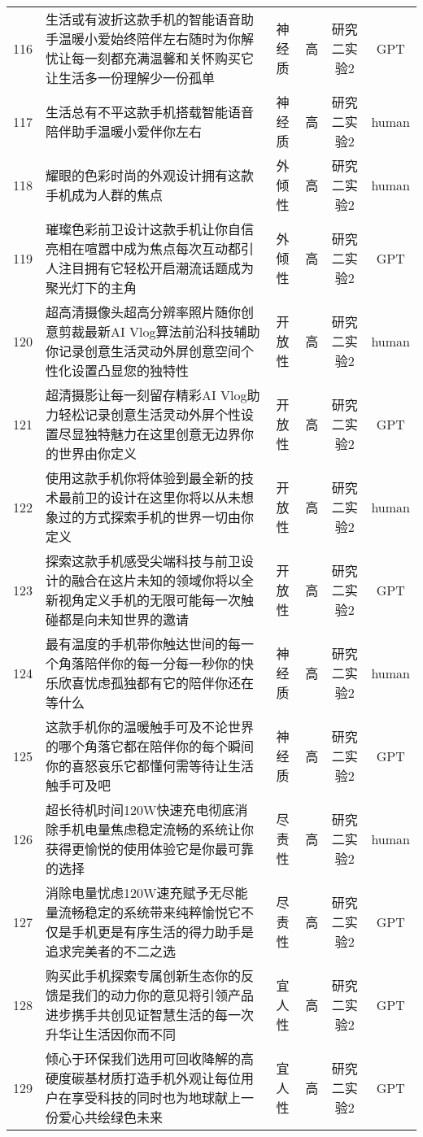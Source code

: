 {\begin{longtable}{c p{8cm} c c c c}
        116 & 生活或有波折这款手机的智能语音助手温暖小爱始终陪伴左右随时为你解忧让每一刻都充满温馨和关怀购买它让生活多一份理解少一份孤单 & 神经质 & 高 & 研究二实验2 & GPT \\
        117 & 生活总有不平这款手机搭载智能语音陪伴助手温暖小爱伴你左右 & 神经质 & 高 & 研究二实验2 & human \\
        118 & 耀眼的色彩时尚的外观设计拥有这款手机成为人群的焦点 & 外倾性 & 高 & 研究二实验2 & human \\
        119 & 璀璨色彩前卫设计这款手机让你自信亮相在喧嚣中成为焦点每次互动都引人注目拥有它轻松开启潮流话题成为聚光灯下的主角 & 外倾性 & 高 & 研究二实验2 & GPT \\
        120 & 超高清摄像头超高分辨率照片随你创意剪裁最新AI Vlog算法前沿科技辅助你记录创意生活灵动外屏创意空间个性化设置凸显您的独特性 & 开放性 & 高 & 研究二实验2 & human \\
        121 & 超清摄影让每一刻留存精彩AI Vlog助力轻松记录创意生活灵动外屏个性设置尽显独特魅力在这里创意无边界你的世界由你定义 & 开放性 & 高 & 研究二实验2 & GPT \\
        122 & 使用这款手机你将体验到最全新的技术最前卫的设计在这里你将以从未想象过的方式探索手机的世界一切由你定义 & 开放性 & 高 & 研究二实验2 & human \\
        123 & 探索这款手机感受尖端科技与前卫设计的融合在这片未知的领域你将以全新视角定义手机的无限可能每一次触碰都是向未知世界的邀请 & 开放性 & 高 & 研究二实验2 & GPT \\
        124 & 最有温度的手机带你触达世间的每一个角落陪伴你的每一分每一秒你的快乐欣喜忧虑孤独都有它的陪伴你还在等什么 & 神经质 & 高 & 研究二实验2 & human \\
        125 & 这款手机你的温暖触手可及不论世界的哪个角落它都在陪伴你的每个瞬间你的喜怒哀乐它都懂何需等待让生活触手可及吧 & 神经质 & 高 & 研究二实验2 & GPT \\
        126 & 超长待机时间120W快速充电彻底消除手机电量焦虑稳定流畅的系统让你获得更愉悦的使用体验它是你最可靠的选择 & 尽责性 & 高 & 研究二实验2 & human \\
        127 & 消除电量忧虑120W速充赋予无尽能量流畅稳定的系统带来纯粹愉悦它不仅是手机更是有序生活的得力助手是追求完美者的不二之选 & 尽责性 & 高 & 研究二实验2 & GPT \\
        128 & 购买此手机探索专属创新生态你的反馈是我们的动力你的意见将引领产品进步携手共创见证智慧生活的每一次升华让生活因你而不同 & 宜人性 & 高 & 研究二实验2 & GPT \\
        129 & 倾心于环保我们选用可回收降解的高硬度碳基材质打造手机外观让每位用户在享受科技的同时也为地球献上一份爱心共绘绿色未来 & 宜人性 & 高 & 研究二实验2 & GPT \\

\end{longtable}}
